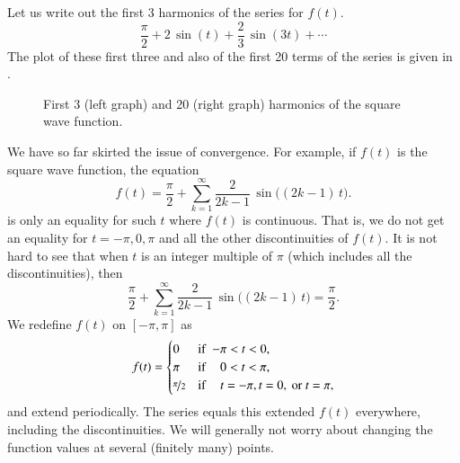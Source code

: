 \begin{example}
Let us write out the first 3 harmonics of the series for $f(t)$.
\begin{equation*}
\frac{\pi}{2}
+
2 \, \sin (t)
+
\frac{2}{3} \, \sin (3t)
+ \cdots
\end{equation*}
The plot of these first three and also of the first 20 terms of the series
is given in
.

\begin{figure}[h!t]
\capstart
\begin{center}
\qquad
{}
\caption{First 3 (left graph) and 20 (right graph) harmonics of the
square wave function.\label{ts:squarewavefsfig}}
\end{center}
\end{figure}
\end{example}

We have so far skirted the issue of convergence.  For example,
if $f(t)$ is the square wave function,
the equation
\begin{equation*}
f(t) = 
\frac{\pi}{2} + \sum_{k=1}^\infty
\frac{2}{2k-1} \,
\sin \bigl( (2k-1)\, t \bigr) .
\end{equation*}
is only an equality for such $t$ where $f(t)$ is continuous.  That is,
we do not get an equality for $t=-\pi,0,\pi$ and all the other discontinuities
of $f(t)$.  It is not hard to see that when $t$ is an integer multiple of
$\pi$ (which includes all the discontinuities), then
\begin{equation*}
\frac{\pi}{2} + \sum_{k=1}^\infty
\frac{2}{2k-1} \,
\sin \bigl( (2k-1)\, t \bigr) = \frac{\pi}{2} .
\end{equation*}
We redefine $f(t)$ on $[-\pi,\pi]$ as
\begin{equation*}
f(t) =
\begin{cases}
0 & \text{if } \; {-\pi} < t < 0 , \\
\pi & \text{if } \; \phantom{-}0 < t < \pi , \\
\nicefrac{\pi}{2} & \text{if } \; \phantom{-}t = -\pi, 
t = 0,\text{ or }
t = \pi,
\end{cases}
\end{equation*}
and extend periodically.
The series equals this extended $f(t)$ everywhere, including the
discontinuities.
We will generally not worry about changing the function values
at several (finitely many) points.

